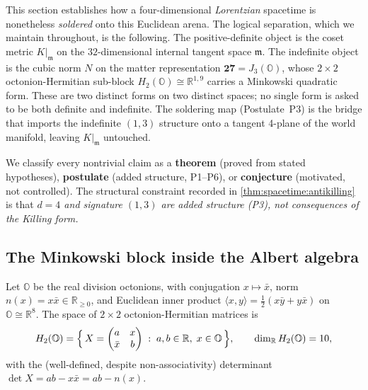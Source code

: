 \documentclass[11pt]{article}
\theoremstyle{plain}
\theoremstyle{definition}
\theoremstyle{remark}
\begin{document}
This section establishes how a four-dimensional \emph{Lorentzian} spacetime is
nonetheless \emph{soldered} onto this Euclidean arena. The logical separation, which
we maintain throughout, is the following. The positive-definite object is the coset
metric $K|_{\mathfrak m}$ on the $32$-dimensional internal tangent space $\mathfrak m$.
The indefinite object is the cubic norm $N$ on the matter representation
$\mathbf{27}=J_3(\mathbb O)$, whose $2\times2$ octonion-Hermitian sub-block
$H_2(\mathbb O)\cong\mathbb R^{1,9}$ carries a Minkowski quadratic form. These are
two distinct forms on two distinct spaces; no single form is asked to be both
definite and indefinite. The soldering map (Postulate~P3) is the bridge that imports
the indefinite $(1,3)$ structure onto a tangent 4-plane of the world manifold,
leaving $K|_{\mathfrak m}$ untouched.

We classify every nontrivial claim as a \textbf{theorem} (proved from stated
hypotheses), \textbf{postulate} (added structure, P1--P6), or
\textbf{conjecture} (motivated, not controlled). The structural constraint
recorded in \autoref{thm:spacetime:antikilling} is that \emph{$d=4$ and signature
$(1,3)$ are added structure (P3), not consequences of the Killing form.}

\subsection{The Minkowski block inside the Albert algebra}
\label{sec:spacetime:block}

Let $\mathbb O$ be the real division octonions, with conjugation $x\mapsto\bar x$,
norm $n(x)=x\bar x\in\mathbb R_{\ge0}$, and Euclidean inner product
$\langle x,y\rangle=\tfrac12(x\bar y+y\bar x)$ on $\mathbb O\cong\mathbb R^8$. The
space of $2\times2$ octonion-Hermitian matrices is
\begin{equation}\label{eq:spacetime:H2O}
  H_2(\mathbb O)=\Bigl\{\,X=\begin{pmatrix} a & x\\ \bar x & b\end{pmatrix}
  \;:\; a,b\in\mathbb R,\; x\in\mathbb O \,\Bigr\},\qquad
  \dim_{\mathbb R}H_2(\mathbb O)=10,
\end{equation}
with the (well-defined, despite non-associativity) determinant
$\det X = ab - x\bar x = ab - n(x)$.
\end{document}
